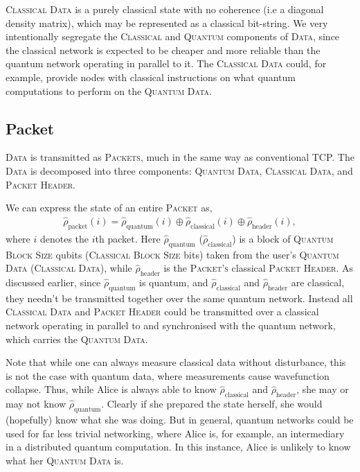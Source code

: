 \documentclass[aps, rmp, twocolumn, amsmath, amssymb, nofootinbib, superscriptaddress, longbibliography, floatfix, table-of-contents, eqsecnum]{revtex4-1}
\begin{document}
\textsc{Classical Data} is a purely classical state with no coherence (i.e a diagonal density matrix), which may be represented as a classical bit-string. We very intentionally segregate the \textsc{Classical} and \textsc{Quantum} components of \textsc{Data}, since the classical network is expected to be cheaper and more reliable than the quantum network operating in parallel to it. The \textsc{Classical Data} could, for example, provide nodes with classical instructions on what quantum computations to perform on the \textsc{Quantum Data}.

%
%

\subsection{Packet} 

\textsc{Data} is transmitted as \textsc{Packets}, much in the same way as conventional TCP. The \textsc{Data} is decomposed into three components: \textsc{Quantum Data}, \textsc{Classical Data}, and \textsc{Packet Header}.

We can express the state of an entire \textsc{Packet} as,
\begin{align}
\hat\rho_\text{packet}(i) = \hat\rho_\text{quantum}(i) \oplus \hat\rho_\text{classical}(i) \oplus \hat\rho_\text{header}(i),
\end{align}
where $i$ denotes the $i$th packet. Here $\hat\rho_\text{quantum}$ ($\hat\rho_\text{classical}$) is a block of \textsc{Quantum Block Size} qubits (\textsc{Classical Block Size} bits) taken from the user's \textsc{Quantum Data} (\textsc{Classical Data}), while $\hat\rho_\text{header}$ is the \textsc{Packet's} classical \textsc{Packet Header}. As discussed earlier, since $\hat\rho_\text{quantum}$ is quantum, and $\hat\rho_\text{classical}$ and $\hat\rho_\text{header}$ are classical, they needn't be transmitted together over the same quantum network. Instead all \textsc{Classical Data} and \textsc{Packet Header} could be transmitted over a classical network operating in parallel to and synchronised with the quantum network, which carries the \textsc{Quantum Data}.

Note that while one can always measure classical data without disturbance, this is not the case with quantum data, where measurements cause wavefunction collapse. Thus, while Alice is always able to know $\hat\rho_\text{classical}$ and $\hat\rho_\text{header}$, she may or may not know $\hat\rho_\text{quantum}$. Clearly if she prepared the state herself, she would (hopefully) know what she was doing. But in general, quantum networks could be used for far less trivial networking, where Alice is, for example, an intermediary in a distributed quantum computation. In this instance, Alice is unlikely to know what her \textsc{Quantum Data} is.
\end{document}
